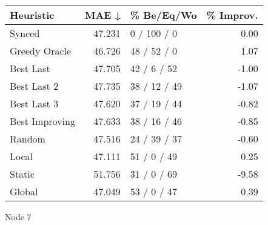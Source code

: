 \begin{tabular}{lrlr}
\toprule
\textbf{Heuristic} & \textbf{MAE ↓} & \textbf{\% Be/Eq/Wo} & \textbf{\% Improv.} \\
\midrule
            Synced &         47.231 &          0 / 100 / 0 &                0.00 \\
     Greedy Oracle &         46.726 &          48 / 52 / 0 &                1.07 \\
         Best Last &         47.705 &          42 / 6 / 52 &               -1.00 \\
       Best Last 2 &         47.735 &         38 / 12 / 49 &               -1.07 \\
       Best Last 3 &         47.620 &         37 / 19 / 44 &               -0.82 \\
    Best Improving &         47.633 &         38 / 16 / 46 &               -0.85 \\
            Random &         47.516 &         24 / 39 / 37 &               -0.60 \\
             Local &         47.111 &          51 / 0 / 49 &                0.25 \\
            Static &         51.756 &          31 / 0 / 69 &               -9.58 \\
            Global &         47.049 &          53 / 0 / 47 &                0.39 \\
\bottomrule
\end{tabular}
\caption{Node 7}
\label{tab:iid_lr05_le2_bs4_7}
